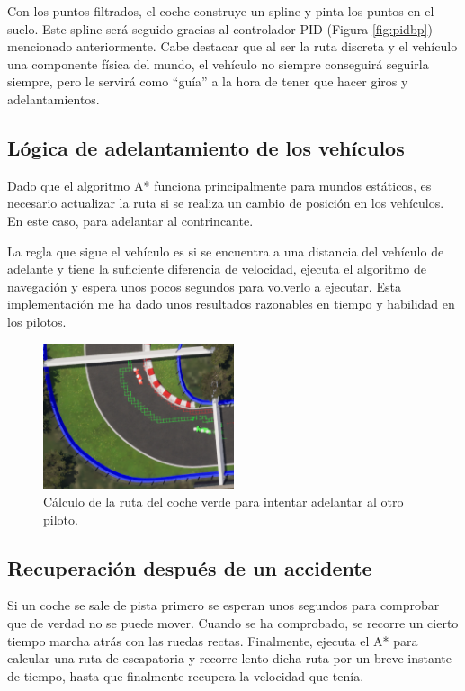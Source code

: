 \bigskip

Con los puntos filtrados, el coche construye un spline y pinta los puntos en el suelo. Este spline será seguido gracias al controlador PID (Figura \ref{fig:pidbp}) mencionado anteriormente. Cabe destacar que al ser la ruta discreta y el vehículo una componente física del mundo, el vehículo no siempre conseguirá seguirla siempre, pero le servirá como ``guía'' a la hora de tener que hacer giros y adelantamientos.

\subsection{Lógica de adelantamiento de los vehículos}

Dado que el algoritmo A* funciona principalmente para mundos estáticos, es necesario actualizar la ruta si se realiza un cambio de posición en los vehículos. En este caso, para adelantar al contrincante.

\bigskip

La regla que sigue el vehículo es si se encuentra a una distancia del vehículo de adelante y tiene la suficiente diferencia de velocidad, ejecuta el algoritmo de navegación y espera unos pocos segundos para volverlo a ejecutar. Esta implementación me ha dado unos resultados razonables en tiempo y habilidad en los pilotos.

\begin{figure}[H]
    \centering
    \includegraphics[width=0.5\textwidth]{imagenes/overtake.png}
    \caption{Cálculo de la ruta del coche verde para intentar adelantar al otro piloto.}
    \label{fig:overtake}
\end{figure}

\subsection{Recuperación después de un accidente}

Si un coche se sale de pista primero se esperan unos segundos para comprobar que de verdad no se puede mover. Cuando se ha comprobado, se recorre un cierto tiempo marcha atrás con las ruedas rectas. Finalmente, ejecuta el A* para calcular una ruta de escapatoria y recorre lento dicha ruta por un breve instante de tiempo, hasta que finalmente recupera la velocidad que tenía.

